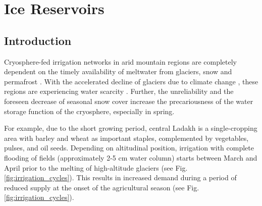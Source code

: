 \chapter{Ice Reservoirs}


\section{Introduction}

Cryosphere-fed irrigation networks in arid mountain regions are completely dependent on the timely availability
of meltwater from glaciers, snow and permafrost \citep{immerzeelImportanceVulnerabilityWorld2020,
farhanHydrologicalRegimesConjunction2015, tveitenGlacierGrowingLocal2007}. With the accelerated decline of
glaciers due to climate change \citep{nusserLocalKnowledgeGlobal2016}, these regions are experiencing water
scarcity \citep{norphelSnowWaterHarvesting2015, mukhopadhyayReevaluationSnowmeltGlacial2015}. Further, the
unreliability and the foreseen decrease of seasonal snow cover \citep{chevuturiClimateChangeLeh2018} increase
the precariousness of the water storage function of the cryosphere, especially in spring.


For example, due to the short growing period, central Ladakh is a single-cropping area with barley and wheat as
important staples, complemented by vegetables, pulses, and oil seeds. Depending on altitudinal position,
irrigation with complete flooding of fields (approximately 2-5 cm water column) starts between March and April
prior to the melting of high-altitude glaciers \citep{nusserSociohydrologyArtificialGlaciers2019} (see Fig.
\ref{fig:irrigation_cycles}). This results in increased demand during a period of reduced supply at the onset of
the agricultural season (see Fig. \ref{fig:irrigation_cycles}).

